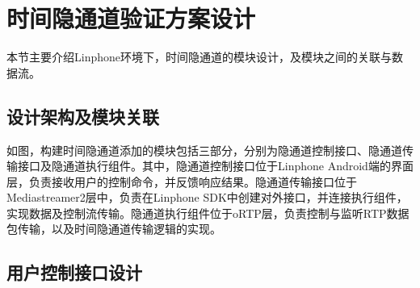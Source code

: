 \section{时间隐通道验证方案设计}
\label{chap:linphone:designation}

本节主要介绍Linphone环境下，时间隐通道的模块设计，及模块之间的关联与数据流。

\subsection{设计架构及模块关联}
\label{chap:linphone:designation:struct}


如图，构建时间隐通道添加的模块包括三部分，分别为隐通道控制接口、隐通道传输接口及隐通道执行组件。其中，隐通道控制接口位于Linphone Android端的界面层，负责接收用户的控制命令，并反馈响应结果。隐通道传输接口位于Mediastreamer2层中，负责在Linphone SDK中创建对外接口，并连接执行组件，实现数据及控制流传输。隐通道执行组件位于oRTP层，负责控制与监听RTP数据包传输，以及时间隐通道传输逻辑的实现。

\subsection{用户控制接口设计}
\label{chap:linphone:designation:ui}

